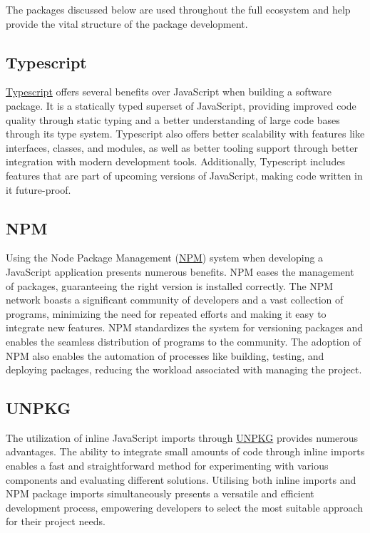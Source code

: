 \documentclass{l4proj}
\begin{document}
The packages discussed below are used throughout the full ecosystem and help provide the vital structure of the package development.

\subsection{Typescript}
\href{https://www.typescriptlang.org/}{Typescript} \text offers several benefits over JavaScript when building a software package. It is a statically typed superset of JavaScript, providing improved code quality through static typing and a better understanding of large code bases through its type system. Typescript also offers better scalability with features like interfaces, classes, and modules, as well as better tooling support through better integration with modern development tools. Additionally, Typescript includes features that are part of upcoming versions of JavaScript, making code written in it future-proof.

\subsection{NPM}
\text Using the Node Package Management (\href{https://www.npmjs.com/}{NPM}) system when developing a JavaScript application presents numerous benefits. NPM eases the management of packages, guaranteeing the right version is installed correctly. The NPM network boasts a significant community of developers and a vast collection of programs, minimizing the need for repeated efforts and making it easy to integrate new features. NPM standardizes the system for versioning packages and enables the seamless distribution of programs to the community. The adoption of NPM also enables the automation of processes like building, testing, and deploying packages, reducing the workload associated with managing the project.


\subsection{UNPKG}
\text The utilization of inline JavaScript imports through \href{https://unpkg.com/}{UNPKG} provides numerous advantages. The ability to integrate small amounts of code through inline imports enables a fast and straightforward method for experimenting with various components and evaluating different solutions. Utilising both inline imports and NPM package imports simultaneously presents a versatile and efficient development process, empowering developers to select the most suitable approach for their project needs.
\end{document}
